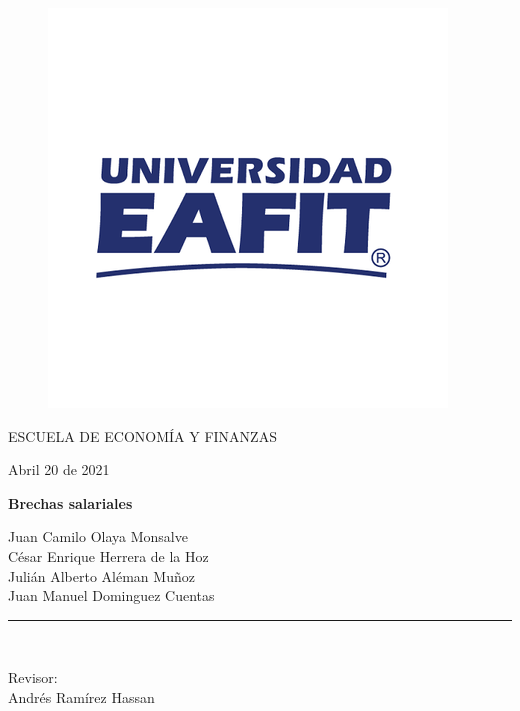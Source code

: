 \documentclass[a4paper]{article}
\begin{document}
	
	\begin{titlepage}
	\begin{center}
		\vspace*{-1in}
			
		\begin{figure}[tbh]
			\centering
			\includegraphics[width=0.7\linewidth]{eafit}
			\label{fig:eafit}
		\end{figure}
			
			ESCUELA DE ECONOMÍA Y FINANZAS\\
			\vspace*{0.6in}
			
		\begin{large}
		    Abril 20 de 2021\\
		\end{large}
			\vspace*{0.2in}
			
		\begin{Large}
			\textbf{Brechas salariales} \\
		\end{Large}
			\vspace*{0.3in}
			
		\begin{large}
			Juan Camilo Olaya Monsalve\\
			César Enrique Herrera de la Hoz\\
			Julián Alberto Aléman Muñoz\\
			Juan Manuel Dominguez Cuentas
		\end{large}
			\vspace*{0.3in}
			\rule{80mm}{0.1mm}\\
			\vspace*{0.1in}
			
		\begin{large}
			Revisor: \\
			Andrés Ramírez Hassan\\
		\end{large}  	
			
	\end{center}	    
	\end{titlepage}
	
\end{document}

